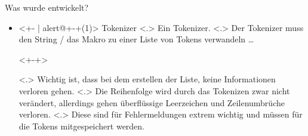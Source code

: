   \begin{frame}{Was wurde entwickelt?}
    \begin{itemize}[<+- | alert@+>]
      \item<+- | alert@+-+(1)>
        Tokenizer
            \note[item]<.>{
              Ein Tokenizer.
            }
            \note[item]<.>{
              Der Tokenizer muss den String / das Makro zu einer Liste von Tokens verwandeln \ldots
            }
        \begin{uncoverenv}<+-+>%
        \end{uncoverenv}%
            \note[item]<.>{
              Wichtig ist, dass bei dem erstellen der Liste, keine Informationen verloren gehen.
            }
            \note[item]<.>{
              Die Reihenfolge wird durch das Tokenizen zwar nicht verändert, allerdings gehen überflüssige Leerzeichen und Zeilenumbrüche verloren.
            }
            \note[item]<.>{
              Diese sind für Fehlermeldungen extrem wichtig und müssen für die Tokens mitgespeichert werden.
            }


\end{itemize}
\end{frame}
